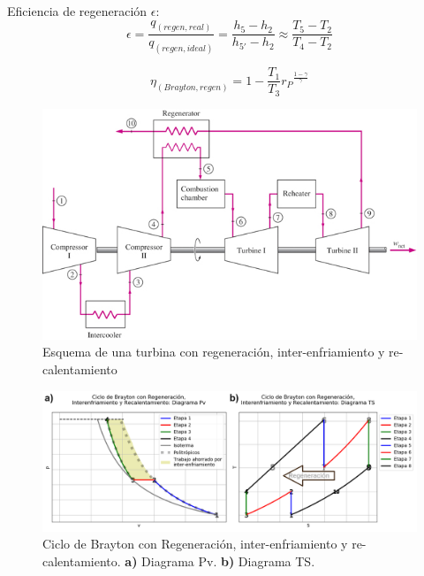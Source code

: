             Eficiencia de regeneración \(\epsilon\):
            \begin{equation}
            \label{ef_reg}
                \epsilon = \frac{q_{(regen, real)}}{q_{(regen, ideal)}} = \frac{h_{5}-h_{2}}{h_{5'}-h_{2}} \approx \frac{T_{5}-T_{2}}{T_{4}-T_{2}}
            \end{equation}
            
            \begin{equation}
            \label{ef_brayton_reg}
                \eta_{(Brayton, regen)} = 1 - \frac{T_{1}}{T_{3}}{r_{P}}^{\frac{1-\gamma}{\gamma}}
            \end{equation}
            
            
            \begin{figure}
                \includegraphics[width=\textwidth]{img/clases/turbina_inter_recal.png}
                \caption{Esquema de una turbina con regeneración, inter-enfriamiento y re-calentamiento}
                \label{fig:turbina_inter_recal}
            \end{figure}
            
            \begin{figure}
                \includegraphics[width=\textwidth]{img/ciclos/ciclo_brayton_reg_enfr.png}
                \caption[Ciclo de Brayton con Regeneración, inter-enfriamiento y re-calentamiento]{Ciclo de Brayton con Regeneración, inter-enfriamiento y re-calentamiento. \textbf{a)} Diagrama Pv. \textbf{b)} Diagrama TS.}
                \label{fig:ciclo_brayton_inter_rec}
            \end{figure}
            \newpage
            
